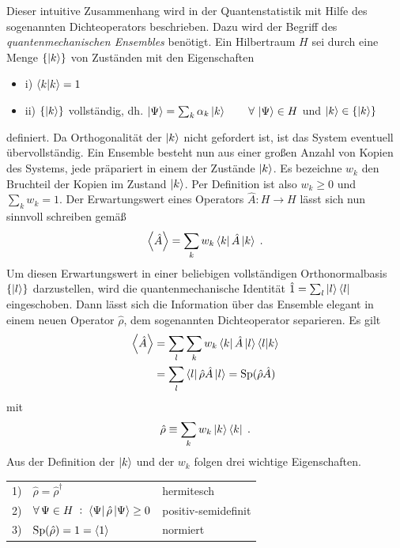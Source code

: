 Dieser intuitive Zusammenhang wird in der Quantenstatistik mit Hilfe des sogenannten Dichteoperators beschrieben. Dazu wird der Begriff des \emph{quantenmechanischen Ensembles} benötigt. Ein Hilbertraum $H$ sei durch eine Menge $\{\ket{k}\}$ von Zuständen mit den Eigenschaften
\begin{itemize}
  \item{i)} $\bra{k}\ket{k} = 1$
  \item{ii)} $\{\ket{k}\}$ vollständig, dh. $\ket{\Psi}=\sum_k \alpha_k\ket{k} \qquad \forall \, \ket{\Psi}\in H$ und $\ket{k}\in\{\ket{k}\}$
\end{itemize}
definiert. Da Orthogonalität der $\ket{k}$ nicht gefordert ist, ist das System eventuell übervollständig. Ein Ensemble besteht nun aus einer großen Anzahl von Kopien des Systems, jede präpariert in einem der Zustände $\ket{k}$. Es bezeichne $w_k$ den Bruchteil der Kopien im Zustand $\ket{k}$. Per Definition ist also $w_k\geq 0$ und $\sum_k w_k = 1$. Der Erwartungswert eines Operators ${\hat{A}:H\rightarrow H}$ lässt sich nun sinnvoll schreiben gemäß
\begin{equation*}
  \expval{\hat{A}} = \sum_k w_k \bra{k}\hat{A}\ket{k} \; .
\end{equation*}
Um diesen Erwartungswert in einer beliebigen vollständigen Orthonormalbasis $\{\ket{l}\}$ darzustellen, wird die quantenmechanische Identität $\hat{1}=\sum_l \ket{l}\bra{l}$ eingeschoben. Dann lässt sich die Information über das Ensemble elegant in einem neuen Operator $\hat{\rho}$, dem sogenannten Dichteoperator separieren. Es gilt
\begin{align}
  \expval{\hat{A}} &= \sum_l \sum_k  w_k \bra{k}\hat{A}\ket{l}\bra{l}\ket{k} \\
   &= \sum_l \bra{l}\hat{\rho} \hat{A}\ket{l} = \text{Sp}(\hat{\rho} \hat{A})
   \label{eq:expval}
\end{align}
mit
\begin{equation}
  \hat{\rho} \equiv \sum_k w_k\ket{k}\bra{k} \; .
  \label{eq:dichteoperator}
\end{equation}
Aus der Definition der $\ket{k}$ und der $w_k$ folgen drei wichtige Eigenschaften.

\begin{tabular}{l l l}
  1)  & $\hat{\rho}=\hat{\rho}^{\dagger}$ & hermitesch \\
  2)  & $\forall \,\Psi\in H \; :\; \bra{\Psi} \hat{\rho} \ket{\Psi} \geq 0$ & positiv-semidefinit \\
  3)  & $\text{Sp}(\hat{\rho})=1 = \expval{1}$ & normiert \\
\end{tabular}

